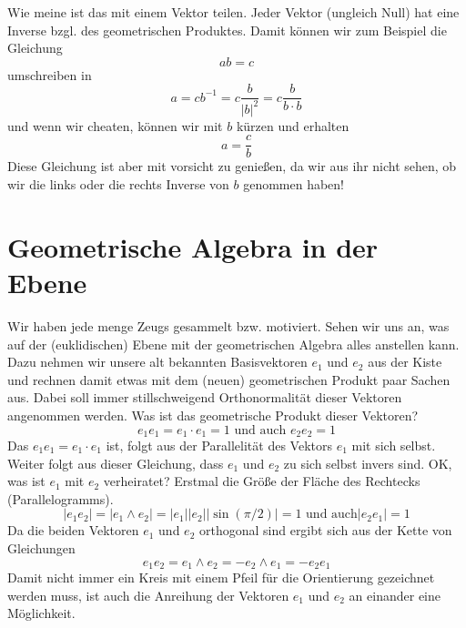 \documentclass[fleqn]{scrartcl}
\numberwithin{equation}{section}
\begin{document}
Wie meine ist das mit einem Vektor teilen. Jeder Vektor (ungleich Null) hat
eine Inverse bzgl. des geometrischen Produktes. Damit können wir zum Beispiel
die Gleichung
\[ab=c\]
umschreiben in
\[a=cb^{-1}=c\frac{b}{|b|^2}=c\frac{b}{b\cdot b}\]
und wenn wir cheaten, können wir mit $b$ kürzen und erhalten
\[a=\frac{c}{b}\]
Diese Gleichung ist aber mit vorsicht zu genießen, da wir aus ihr nicht sehen,
ob wir die links oder die rechts Inverse von $b$ genommen haben!
\section{Geometrische Algebra in der Ebene}
Wir haben jede menge Zeugs gesammelt bzw. motiviert. Sehen wir uns an, was auf
der (euklidischen) Ebene mit der geometrischen Algebra alles anstellen kann.
Dazu nehmen wir unsere alt bekannten Basisvektoren $e_1$ und $e_2$ aus der
Kiste und rechnen damit etwas mit dem (neuen) geometrischen Produkt paar
Sachen aus. Dabei soll immer stillschweigend Orthonormalität dieser Vektoren
angenommen werden. Was ist das geometrische Produkt dieser Vektoren?
\[e_1e_1=e_1\cdot e_1=1\textrm{ und auch }e_2e_2=1\]
Das $e_1e_1 = e_1\cdot e_1$ ist, folgt aus der Parallelität des Vektors $e_1$
mit sich selbst. Weiter folgt aus dieser Gleichung, dass $e_1$ und $e_2$ zu
sich selbst invers sind. OK, was ist $e_1$ mit $e_2$ verheiratet? Erstmal die
Größe der Fläche des Rechtecks (Parallelogramms).
\[|e_1e_2|=|e_1\wedge e_2|=|e_1||e_2||\sin(\pi/2)|=1\textrm{ und auch
}|e_2e_1|=1\]
Da die beiden Vektoren $e_1$ und $e_2$ orthogonal sind ergibt sich aus der
Kette von Gleichungen
\[e_1e_2=e_1\wedge e_2 = -e_2\wedge e_1 = -e_2e_1\]
Damit nicht immer ein Kreis mit einem Pfeil für die Orientierung gezeichnet
werden muss, ist auch die Anreihung der Vektoren $e_1$ und $e_2$ an einander
eine Möglichkeit.
\end{document}
